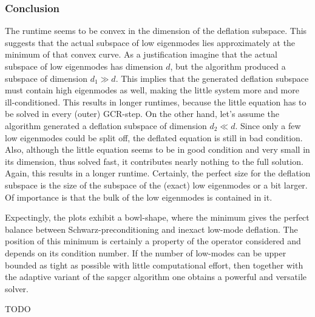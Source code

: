 \documentclass{article}
\theoremstyle{plain} %
\theoremstyle{convention} %
\theoremstyle{remark} %
\numberwithin{equation}{section}
\begin{document}
\subsubsection{Conclusion}

The runtime seems to be convex in the dimension of the deflation subspace. This suggests that the actual subspace of low eigenmodes lies approximately at the minimum of that convex curve. As a justification imagine that the actual subspace of low eigenmodes has dimension $d$, but the algorithm produced a subspace of dimension $d_1 \gg d$. This implies that the generated deflation subspace must contain high eigenmodes as well, making the little system more and more ill-conditioned. This results in longer runtimes, because the little equation has to be solved in every (outer) GCR-step. On the other hand, let's assume the algorithm generated a deflation subspace of dimension $d_2 \ll d$. Since only a few low eigenmodes could be split off, the deflated equation is still in bad condition. Also, although the little equation seems to be in good condition and very small in its dimension, thus solved fast, it contributes nearly nothing to the full solution. Again, this results in a longer runtime. Certainly, the perfect size for the deflation subspace is the size of the subspace of the (exact) low eigenmodes or a bit larger. Of importance is that the bulk of the low eigenmodes is contained in it.

Expectingly, the plots exhibit a bowl-shape, where the minimum gives the perfect balance between Schwarz-preconditioning and inexact low-mode deflation. The position of this minimum is certainly a property of the operator considered and depends on its condition number. If the number of low-modes can be upper bounded as tight as possible with little computational effort, then together with the adaptive variant of the \acrshort*{sapgcr} algorithm one obtains a powerful and versatile solver.

TODO

\end{document}
